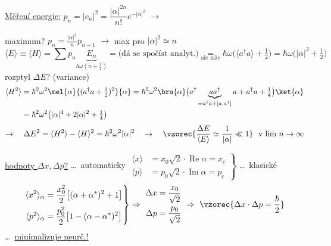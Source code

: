 \underline{Měření energie:} \quad $p_n = |c_n|^2 = \dfrac{|\alpha|^{2n}}{n!}e^{-|\alpha|^2}$ \quad $\to$ 

maximum? \quad $p_n = \frac{|\alpha|^2}{n}p_{n-1}$ \quad $\to$ max pro $|\alpha|^2\simeq n$
\[
  \langle E\rangle \equiv \langle H\rangle = \sum p_n\underbrace{E_n}_{\hbar\omega(n+\frac12)} = \text{(dá se spočíst analyt.)}
  \underset{\text{ale níže}}{=} \hbar\omega\big(\langle a^\dagger a\rangle + \tfrac12\big) = \hbar\omega\big(|\alpha|^2 + \tfrac12\big)
\]
rozptyl $\Delta E$? (variance)
\begin{align*}
  \langle H^2\rangle &= \hbar^2\omega^2\mel{\alpha}{(a^\dagger a + \tfrac12)^2}{\alpha}
   = \hbar^2\omega^2\bra{\alpha}\big(a^\dagger\underbrace{aa^\dagger}_{=a^\dagger a + [a,a^\dagger]}a + a^\dagger a + \tfrac14\big)\ket{\alpha} \\
  &= \hbar^2\omega^2\big(|\alpha|^4 + 2|\alpha|^2 + \tfrac14\big)
\end{align*}
\[
  \to\quad \Delta E^2 = \langle H^2\rangle - \langle H\rangle^2 = \hbar^2\omega^2|\alpha|^2
  \quad\to\quad \vzorec{\frac{\Delta E}{\langle E\rangle} \simeq \frac{1}{|\alpha|} \ll 1}\ \text{ v lim } n\to\infty
\]

\underline{hodnoty $\Delta x,\Delta p$?} \quad \dots\ automaticky \quad
$\left.\begin{aligned}
  \langle x\rangle &= x_0\sqrt2\cdot\operatorname{Re}\alpha = x_c \\
  \langle p\rangle &= p_0\sqrt2\cdot\operatorname{Im}\alpha = p_c
\end{aligned}\right\}$ \dots\ klasické \\
\hspace*{9cm} 
\[
  \left.\begin{aligned}
    \langle x^2\rangle_\alpha &= \frac{x_0^2}{2}\big[(\alpha+\alpha^*)^2 + 1\big] \\
    \langle p^2\rangle_\alpha &= \frac{p_0^2}{2}\big[1 - (\alpha-\alpha^*)^2\big]
  \end{aligned}\right\}
  \Rightarrow\
  \begin{aligned}
    \Delta x &= \frac{x_0}{\sqrt2} \\
    \Delta p &= \frac{p_0}{\sqrt2}
  \end{aligned}
  \ \Rightarrow\ \vzorec{\Delta x\cdot\Delta p = \frac{\hbar}{2}}
\]
\hfill \dots\ \underline{minimalizuje neurč.!}

